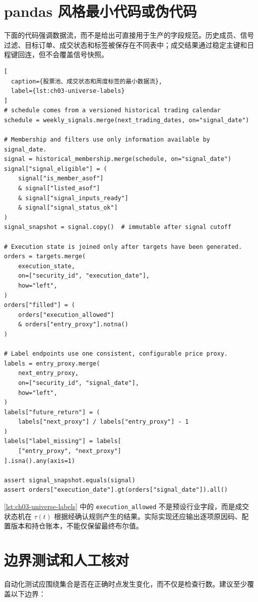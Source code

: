 \section{pandas 风格最小代码或伪代码}

下面的代码强调数据流，而不是给出可直接用于生产的字段规范。历史成员、信号过滤、目标订单、成交状态和标签被保存在不同表中；成交结果通过稳定主键和日程键回连，但不会覆盖信号快照。

\begin{lstlisting}[
  caption={股票池、成交状态和周度标签的最小数据流},
  label={lst:ch03-universe-labels}
]
# schedule comes from a versioned historical trading calendar
schedule = weekly_signals.merge(next_trading_dates, on="signal_date")

# Membership and filters use only information available by signal_date.
signal = historical_membership.merge(schedule, on="signal_date")
signal["signal_eligible"] = (
    signal["is_member_asof"]
    & signal["listed_asof"]
    & signal["signal_inputs_ready"]
    & signal["signal_status_ok"]
)
signal_snapshot = signal.copy()  # immutable after signal cutoff

# Execution state is joined only after targets have been generated.
orders = targets.merge(
    execution_state,
    on=["security_id", "execution_date"],
    how="left",
)
orders["filled"] = (
    orders["execution_allowed"]
    & orders["entry_proxy"].notna()
)

# Label endpoints use one consistent, configurable price proxy.
labels = entry_proxy.merge(
    next_entry_proxy,
    on=["security_id", "signal_date"],
    how="left",
)
labels["future_return"] = (
    labels["next_proxy"] / labels["entry_proxy"] - 1
)
labels["label_missing"] = labels[
    ["entry_proxy", "next_proxy"]
].isna().any(axis=1)

assert signal_snapshot.equals(signal)
assert orders["execution_date"].gt(orders["signal_date"]).all()
\end{lstlisting}

\cref{lst:ch03-universe-labels} 中的 \texttt{execution\_allowed} 不是预设行业字段，而是成交状态机在 \(\tau(t)\) 根据经确认规则产生的结果。实际实现还应输出逐项原因码、配置版本和持仓账本，不能仅保留最终布尔值。

\section{边界测试和人工核对}

自动化测试应围绕集合是否在正确时点发生变化，而不仅是检查行数。建议至少覆盖以下边界：

